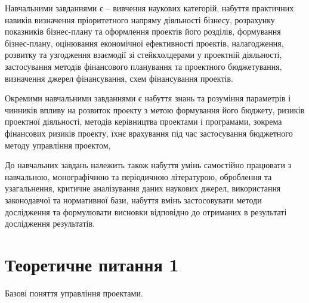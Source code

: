 \documentclass[oneside,14pt]{extarticle}
\begin{document}
Навчальними завданнями є – вивчення наукових категорій, набуття практичних навиків визначення пріоритетного напряму діяльності бізнесу, розрахунку показників бізнес-плану та оформлення проектів його розділів, формування бізнес-плану, оцінювання економічної ефективності проектів, налагодження, розвитку та узгодження взаємодії зі стейкхолдерами у проектній діяльності, застосування методів фінансового планування та проектного бюджетування, визначення джерел фінансування, схем фінансування проектів. 

Окремими навчальними завданнями є набуття знань та розуміння параметрів і чинників впливу на розвиток проекту з метою формування його бюджету, ризиків проектної діяльності, методів керівництва проектами і програмами, зокрема фінансових ризиків проекту, їхнє врахування під час застосування бюджетного методу управління проектом, 

До навчальних завдань належить також набуття умінь самостійно працювати з навчальною, монографічною та періодичною літературою, оброблення та узагальнення, критичне аналізування даних наукових джерел, використання законодавчої та нормативної бази, набуття вмінь застосовувати методи дослідження та формулювати висновки відповідно до отриманих в результаті дослідження результатів.

\newpage
\section*{Теоретичне питання 1}

Базові поняття управління проектами.
\end{document}
